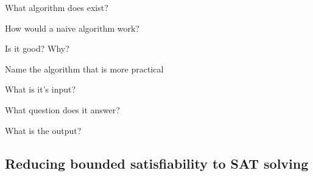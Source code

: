 \documentclass[fleqn]{article}
\begin{document}
\begin{enumerate}
    {\color{blue}\item What algorithm does exist?}
    {\color{red}\item How would a naive algorithm work?}
    {\color{red}\item Is it good? Why?}
    \item Name the algorithm that is more practical
    \begin{itemize}
        {\color{blue}\item What is it's input?}
        {\color{blue}\item What question does it answer?}
        \item What is the output?
    \end{itemize}
\end{enumerate}

\subsection{Reducing bounded satisfiability to SAT solving}
\end{document}
